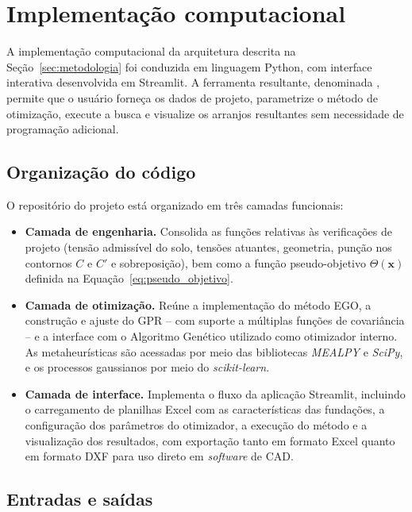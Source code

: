 \section{Implementação computacional}
\label{sec:implementacao}

A implementação computacional da arquitetura descrita na Seção~\ref{sec:metodologia} foi conduzida em linguagem Python, com interface interativa desenvolvida em Streamlit. A ferramenta resultante, denominada \fundaai{}, permite que o usuário forneça os dados de projeto, parametrize o método de otimização, execute a busca e visualize os arranjos resultantes sem necessidade de programação adicional.

\subsection{Organização do código}
\label{sec:impl_organizacao}

O repositório do projeto está organizado em três camadas funcionais:
\begin{itemize}
    \item \textbf{Camada de engenharia.} Consolida as funções relativas às verificações de projeto (tensão admissível do solo, tensões atuantes, geometria, punção nos contornos $C$ e $C'$ e sobreposição), bem como a função pseudo-objetivo $\Theta(\bm{x})$ definida na Equação~\eqref{eq:pseudo_objetivo}.
    \item \textbf{Camada de otimização.} Reúne a implementação do método EGO, a construção e ajuste do GPR -- com suporte a múltiplas funções de covariância -- e a interface com o Algoritmo Genético utilizado como otimizador interno. As metaheurísticas são acessadas por meio das bibliotecas \textit{MEALPY} e \textit{SciPy}, e os processos gaussianos por meio do \textit{scikit-learn}.
    \item \textbf{Camada de interface.} Implementa o fluxo da aplicação Streamlit, incluindo o carregamento de planilhas Excel com as características das fundações, a configuração dos parâmetros do otimizador, a execução do método e a visualização dos resultados, com exportação tanto em formato Excel quanto em formato DXF para uso direto em \textit{software} de CAD.
\end{itemize}

\subsection{Entradas e saídas}
\label{sec:impl_io}

